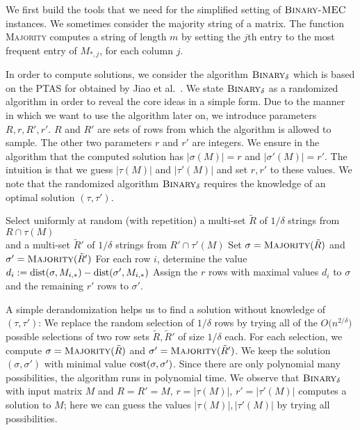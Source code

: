 We first build the tools that we need for the simplified setting of $\textsc{Binary-MEC}$ instances. 
We sometimes consider the majority string of a matrix. 
The function \textsc{Majority} computes a string of length $m$ by setting the $j$th entry to the most frequent entry of $M_{*,j}$, for each column $j$.

In order to compute \BMEC solutions, we consider the algorithm $\textsc{Binary}_\delta$ which is based on the PTAS for \BMEC obtained by Jiao et al.~\cite{JXL04_k}.
We state $\textsc{Binary}_\delta$ as a randomized algorithm in order to reveal the core ideas in a simple form. 
Due to the manner in which we want to use the algorithm later on, we introduce parameters $R,r,R',r'$.
$R$ and $R'$ are sets of rows from which the algorithm is allowed to sample. 
The other two parameters $r$ and $r'$ are integers.
We ensure in the algorithm that the computed solution has $|\sigma(M)| = r$ and $|\sigma'(M)| = r'$.
The intuition is that we guess $|\tau(M)|$ and $|\tau'(M)|$ and set $r,r'$ to these values.
We note that the randomized algorithm $\textsc{Binary}_\delta$ requires the knowledge of an optimal solution $(\tau,\tau')$. 

\begin{algorithm}
    \caption{
    \label{alg:binaryMEC}
    $\textsc{Binary}_\delta$}
  \SetAlgoNoLine
  \SetNlSkip{1em}
  Select uniformly at random (with repetition) a multi-set $\tilde{R}$ of $1/\delta$ strings from $R \cap \tau(M)$ \\
  \quad and a multi-set $\tilde{R}'$ of $1/\delta$ strings from $R' \cap \tau'(M)$\;
  Set $\sigma = \textsc{Majority}(\tilde{R})$ and $\sigma' = \textsc{Majority}(\tilde{R}')$\;
  For each row $i$, determine the value $d_i := \mathrm{dist}(\sigma,M_{i,*}) - \mathrm{dist}(\sigma',M_{i,*})$\;
  Assign the $r$ rows with maximal values $d_i$ to $\sigma$ and the remaining $r'$ rows to $\sigma'$.
\end{algorithm}

A simple derandomization helps us to find a solution without knowledge of $(\tau,\tau')$: We replace the random selection of $1/\delta$ rows by trying all of the 
$O\bigl(n^{2/\delta}\bigr)$ possible selections of two row sets $\tilde{R}, \tilde{R}'$ of size $1/\delta$ each.
For each selection, we compute $\sigma = \textsc{Majority}(\tilde{R})$ and $\sigma' = \textsc{Majority}(\tilde{R}')$.
We keep the solution $(\sigma,\sigma')$ with minimal value $\mathrm{cost}(\sigma,\sigma')$. 
Since there are only polynomial many possibilities, the algorithm runs in polynomial time.
We observe that $\textsc{Binary}_\delta$ with input matrix $M$ and $R=R'=M$, $r = |\tau(M)|$, $r' = |\tau'(M)|$ computes a \BMEC solution to $M$; here we can guess the values $|\tau(M)|,|\tau'(M)|$ by trying all possibilities.

